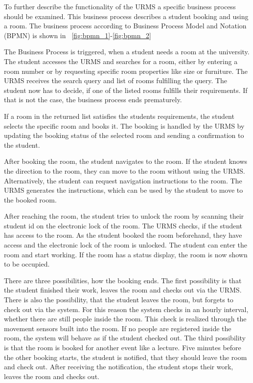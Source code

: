 \documentclass[conference,onecolumn]{IEEEtran}
\begin{document}
To further describe the functionality of the URMS a specific business process should be examined. This business process describes a student booking and using a room. The business process according to Business Process Model and Notation (BPMN) is shown in \figurename~\ref{fig:bpmn_1}-\ref{fig:bpmn_2}

The Business Process is triggered, when a student needs a room at the university.
The student accesses the URMS and searches for a room, either by entering a room number or by requesting specific room properties like size or furniture.
The URMS receives the search query and list of rooms fulfilling the query.
The student now has to decide, if one of the listed rooms fulfills their requirements. If that is not the case, the business process ends prematurely.

If a room in the returned list satisfies the students requirements, the student selects the specific room and books it.
The booking is handled by the URMS by updating the booking status of the selected room and sending a confirmation to the student.

After booking the room, the student navigates to the room.
If the student knows the direction to the room, they can move to the room without using the URMS.
Alternatively, the student can request navigation instructions to the room. The URMS generates the instructions, which can be used by the student to move to the booked room.

After reaching the room, the student tries to unlock the room by scanning their student id on the electronic lock of the room.
The URMS checks, if the student has access to the room. As the student booked the room beforehand, they have access and the electronic lock of the room is unlocked.
The student can enter the room and start working.
If the room has a status display, the room is now shown to be occupied.

There are three possibilities, how the booking ends.
The first possibility is that the student finished their work, leaves the room and checks out via the URMS.
There is also the possibility, that the student leaves the room, but forgets to check out via the system. For this reason the system checks in an hourly interval, whether there are still people inside the room. This check is realized through the movement sensors built into the room. If no people are registered inside the room, the system will behave as if the student checked out.
The third possibility is that the room is booked for another event like a lecture.
Five minutes before the other booking starts, the student is notified, that they should leave the room and check out. After receiving the notification, the student stops their work, leaves the room and checks out.
\end{document}

